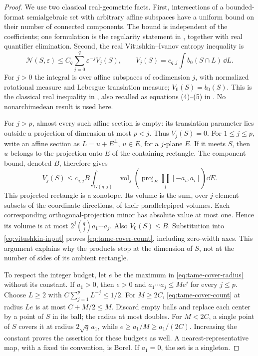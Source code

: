 \begin{proof}
We use two classical real-geometric facts. First, intersections of a
bounded-format semialgebraic set with arbitrary affine subspaces have a
uniform bound on their number of connected components. The bound is
independent of the coefficients; one formulation is the regularity
statement in \cite[Lemma 2.18]{ZhangKileel}, together with real quantifier
elimination. Second, the real Vitushkin--Ivanov entropy inequality is
\begin{equation}\label{eq:vitushkin-input}
 \mathcal N(S,\varepsilon)\le C_q\sum_{j=0}^q
       \varepsilon^{-j}V_j(S),\qquad
 V_j(S)=c_{q,j}\int b_0(S\cap L)\,\dd L.
\end{equation}
For $j>0$ the integral is over affine subspaces of codimension $j$,
with normalized rotational measure and Lebesgue translation measure;
$V_0(S)=b_0(S)$. This is the classical real inequality in
\cite[Theorem 3.5]{YomdinComte}, also recalled as equations (4)--(5)
in \cite{ComteHalupczok}. No nonarchimedean result is used here.

For $j>p$, almost every such affine section is empty: its translation
parameter lies outside a projection of dimension at most $p<j$.
Thus $V_j(S)=0$. For $1\le j\le p$, write an affine section as
$L=u+E^\perp$, $u\in E$, for a $j$-plane $E$. If it meets $S$,
then $u$ belongs to the projection onto $E$ of the containing rectangle.
The component bound, denoted $B$, therefore gives
\[
 V_j(S)\le c_{q,j}B
      \int_{G(q,j)}\operatorname{vol}_j
       \left(\operatorname{proj}_E\prod_i[-a_i,a_i]\right)\dd E.
\]
This projected rectangle is a zonotope. Its volume is the sum, over
$j$-element subsets of the coordinate directions, of their parallelepiped
volumes. Each corresponding orthogonal-projection minor has absolute
value at most one. Hence its volume is at most
$2^j\binom qj a_1\cdots a_j$. Also $V_0(S)\le B$.
Substitution into \eqref{eq:vitushkin-input} proves
\eqref{eq:tame-cover-count}, including zero-width axes. This argument
explains why the products stop at the dimension of $S$, not at the
number of sides of its ambient rectangle.

To respect the integer budget, let $e$ be the maximum in
\eqref{eq:tame-cover-radius} without its constant. If $a_1>0$, then
$e>0$ and $a_1\cdots a_j\le Me^j$ for every $j\le p$.
Choose $L\ge2$ with $C\sum_{j=1}^p L^{-j}\le1/2$. For
$M\ge2C$, \eqref{eq:tame-cover-count} at radius $Le$ is at most
$C+M/2\le M$. Discard empty balls and replace each center by a point
of $S$ in its ball; the radius at most doubles. For $M<2C$, a single
point of $S$ covers it at radius $2\sqrt q\,a_1$, while
$e\ge a_1/M\ge a_1/(2C)$. Increasing the constant proves the assertion
for these budgets as well. A nearest-representative map, with a fixed
tie convention, is Borel. If $a_1=0$, the set is a singleton.
\end{proof}

